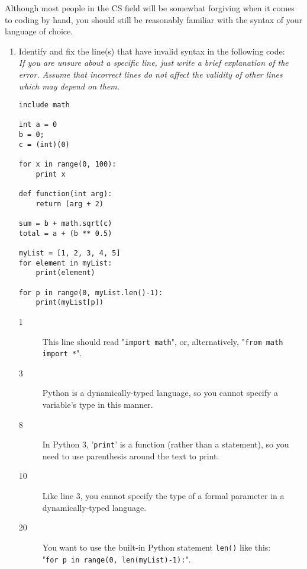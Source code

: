 Although most people in the CS field will be somewhat forgiving when it comes to coding by hand,
you should still be reasonably familiar with the syntax of your language of choice.

\begin{enumerate}
\item Identify and fix the line(s) that have invalid syntax in the following code:\\
\emph{If you are unsure about a specific line, just write a brief explanation of the error. Assume that incorrect lines do not affect the validity of other lines which may depend on them.}
\begin{lstlisting}
include math

int a = 0
b = 0;
c = (int)(0)

for x in range(0, 100):
	print x

def function(int arg):
	return (arg + 2)

sum = b + math.sqrt(c)
total = a + (b ** 0.5)

myList = [1, 2, 3, 4, 5]
for element in myList:
	print(element)

for p in range(0, myList.len()-1):
	print(myList[p])
\end{lstlisting}

\begin{answer}
\begin{description}

	\item[1] This line should read "\texttt{import math}", or, alternatively, "\texttt{from math import *}".
	\item[3] Python is a dynamically-typed language, so you cannot specify a variable's type in this manner.
	\item[8] In Python 3, '\texttt{print}' is a function (rather than a statement), so you need to use parenthesis around the text to print.
	\item[10] Like line 3, you cannot specify the type of a formal parameter in a dynamically-typed language.
	\item[20] You want to use the built-in Python statement \texttt{len()} like this:\\
	 "\texttt{for p in range(0, len(myList)-1):}".

\end{description}
\end{answer}


\end{enumerate}
